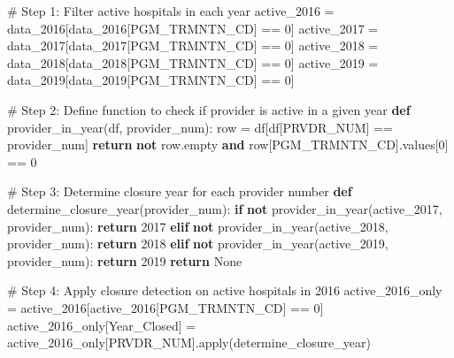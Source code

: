 \documentclass[
  letterpaper,
  DIV=11,
  numbers=noendperiod]{scrartcl}
\newenvironment{Shaded}{\begin{snugshade}}{\end{snugshade}}
\newcommand{\BuiltInTok}[1]{\textcolor[rgb]{0.00,0.23,0.31}{#1}}
\newcommand{\CommentTok}[1]{\textcolor[rgb]{0.37,0.37,0.37}{#1}}
\newcommand{\ControlFlowTok}[1]{\textcolor[rgb]{0.00,0.23,0.31}{\textbf{#1}}}
\newcommand{\DecValTok}[1]{\textcolor[rgb]{0.68,0.00,0.00}{#1}}
\newcommand{\KeywordTok}[1]{\textcolor[rgb]{0.00,0.23,0.31}{\textbf{#1}}}
\newcommand{\NormalTok}[1]{\textcolor[rgb]{0.00,0.23,0.31}{#1}}
\newcommand{\OperatorTok}[1]{\textcolor[rgb]{0.37,0.37,0.37}{#1}}
\newcommand{\StringTok}[1]{\textcolor[rgb]{0.13,0.47,0.30}{#1}}
\newcommand{\VariableTok}[1]{\textcolor[rgb]{0.07,0.07,0.07}{#1}}
\begin{document}
\begin{Shaded}
\begin{Highlighting}[]
\CommentTok{\# Step 1: Filter active hospitals in each year}
\NormalTok{active\_2016 }\OperatorTok{=}\NormalTok{ data\_2016[data\_2016[}\StringTok{\textquotesingle{}PGM\_TRMNTN\_CD\textquotesingle{}}\NormalTok{] }\OperatorTok{==} \DecValTok{0}\NormalTok{]}
\NormalTok{active\_2017 }\OperatorTok{=}\NormalTok{ data\_2017[data\_2017[}\StringTok{\textquotesingle{}PGM\_TRMNTN\_CD\textquotesingle{}}\NormalTok{] }\OperatorTok{==} \DecValTok{0}\NormalTok{]}
\NormalTok{active\_2018 }\OperatorTok{=}\NormalTok{ data\_2018[data\_2018[}\StringTok{\textquotesingle{}PGM\_TRMNTN\_CD\textquotesingle{}}\NormalTok{] }\OperatorTok{==} \DecValTok{0}\NormalTok{]}
\NormalTok{active\_2019 }\OperatorTok{=}\NormalTok{ data\_2019[data\_2019[}\StringTok{\textquotesingle{}PGM\_TRMNTN\_CD\textquotesingle{}}\NormalTok{] }\OperatorTok{==} \DecValTok{0}\NormalTok{]}

\CommentTok{\# Step 2: Define function to check if provider is active in a given year}
\KeywordTok{def}\NormalTok{ provider\_in\_year(df, provider\_num):}
\NormalTok{    row }\OperatorTok{=}\NormalTok{ df[df[}\StringTok{\textquotesingle{}PRVDR\_NUM\textquotesingle{}}\NormalTok{] }\OperatorTok{==}\NormalTok{ provider\_num]}
    \ControlFlowTok{return} \KeywordTok{not}\NormalTok{ row.empty }\KeywordTok{and}\NormalTok{ row[}\StringTok{\textquotesingle{}PGM\_TRMNTN\_CD\textquotesingle{}}\NormalTok{].values[}\DecValTok{0}\NormalTok{] }\OperatorTok{==} \DecValTok{0}

\CommentTok{\# Step 3: Determine closure year for each provider number}
\KeywordTok{def}\NormalTok{ determine\_closure\_year(provider\_num):}
    \ControlFlowTok{if} \KeywordTok{not}\NormalTok{ provider\_in\_year(active\_2017, provider\_num):}
        \ControlFlowTok{return} \DecValTok{2017}
    \ControlFlowTok{elif} \KeywordTok{not}\NormalTok{ provider\_in\_year(active\_2018, provider\_num):}
        \ControlFlowTok{return} \DecValTok{2018}
    \ControlFlowTok{elif} \KeywordTok{not}\NormalTok{ provider\_in\_year(active\_2019, provider\_num):}
        \ControlFlowTok{return} \DecValTok{2019}
    \ControlFlowTok{return} \VariableTok{None}

\CommentTok{\# Step 4: Apply closure detection on active hospitals in 2016}
\NormalTok{active\_2016\_only }\OperatorTok{=}\NormalTok{ active\_2016[active\_2016[}\StringTok{\textquotesingle{}PGM\_TRMNTN\_CD\textquotesingle{}}\NormalTok{] }\OperatorTok{==} \DecValTok{0}\NormalTok{]}
\NormalTok{active\_2016\_only[}\StringTok{\textquotesingle{}Year\_Closed\textquotesingle{}}\NormalTok{] }\OperatorTok{=}\NormalTok{ active\_2016\_only[}\StringTok{\textquotesingle{}PRVDR\_NUM\textquotesingle{}}\NormalTok{].}\BuiltInTok{apply}\NormalTok{(determine\_closure\_year)}


\end{Highlighting}
\end{Shaded}
\end{document}
